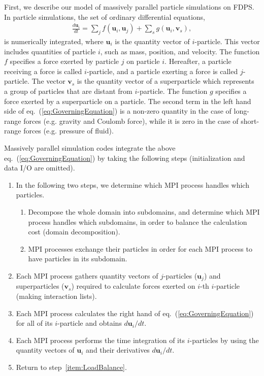First, we describe our model of massively parallel particle simulations on FDPS. In particle simulations, the set of ordinary differential equations,
\begin{align}
    \frac{d\bm{u}_i}{dt} = \sum_j f(\bm{u}_i,\bm{u}_j) + \sum_s
    g(\bm{u}_i,\bm{v}_s), \label{eq:GoverningEquation}
\end{align}
is numerically integrated, where $\bm{u}_i$ is the quantity vector of $i$-particle. This vector includes quantities of particle $i$, such as mass, position, and velocity. The function $f$ specifies a force exerted by particle $j$ on particle $i$. Hereafter, a particle receiving a force is called $i$-particle, and a particle exerting a force is called $j$-particle. The vector $\bm{v}_s$ is the quantity vector of a superparticle which represents a group of particles that are distant from $i$-particle. The function $g$ specifies a force exerted by a superparticle on a particle. The second term in the left hand side of eq.~(\ref{eq:GoverningEquation}) is a non-zero quantity in the case of long-range forces (e.g. gravity and Coulomb force), while it is zero in the case of short-range forces (e.g. pressure of fluid).

Massively parallel simulation codes integrate the above eq.~(\ref{eq:GoverningEquation}) by taking the following steps (initialization and data I/O are omitted).
\begin{enumerate}
\item In the following two steps, we determine which MPI process handles which particles. \label{item:LoadBalance}
\begin{enumerate}
\item Decompose the whole domain into subdomains, and determine which MPI process handles which subdomains, in order to balance the calculation cost (domain decomposition).
\item MPI processes exchange their particles in order for each MPI process to have particles in its subdomain.
\end{enumerate}

\item Each MPI process gathers quantity vectors of $j$-particles ($\bm{u}_j$) and superparticles ($\bm{v}_s$) required to calculate forces exerted on $i$-th $i$-particle (making interaction lists). \label{item:MakeInteractionList}

\item Each MPI process calculates the right hand of eq.~(\ref{eq:GoverningEquation}) for all of its $i$-particle and obtains $d\bm{u}_i/dt$. \label{item:CalcInteraction}

\item Each MPI process performs the time integration of its $i$-particles by using the quantity vectors of $\bm{u}_i$ and their derivatives $d\bm{u}_i/dt$. \label{item:IntegrateTime}

\item Return to step~\ref{item:LoadBalance}.
\end{enumerate}

